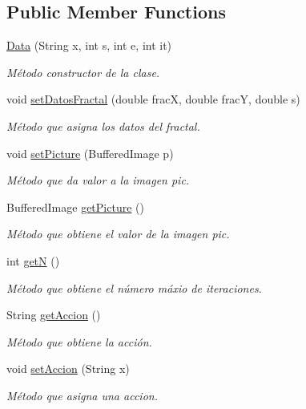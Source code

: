 \subsection*{Public Member Functions}
\begin{DoxyCompactItemize}
\item 
\hyperlink{class_data_a4fd35b503a2759c5b67b30ae97efeabf}{Data} (String x, int s, int e, int it)
\begin{DoxyCompactList}\small\item\em Método constructor de la clase. \end{DoxyCompactList}\item 
void \hyperlink{class_data_a3677f709c98be676148e4fb8e08b1015}{set\+Datos\+Fractal} (double frac\+X, double frac\+Y, double s)
\begin{DoxyCompactList}\small\item\em Método que asigna los datos del fractal. \end{DoxyCompactList}\item 
void \hyperlink{class_data_ae26392ae0b534ed76ac0fe98d0b087fc}{set\+Picture} (Buffered\+Image p)
\begin{DoxyCompactList}\small\item\em Método que da valor a la imagen pic. \end{DoxyCompactList}\item 
Buffered\+Image \hyperlink{class_data_a64deecf379fc77a5c7fcc37524e793ba}{get\+Picture} ()
\begin{DoxyCompactList}\small\item\em Método que obtiene el valor de la imagen pic. \end{DoxyCompactList}\item 
int \hyperlink{class_data_a6bf2736c6dd62244dc1430723a3af3a7}{get\+N} ()
\begin{DoxyCompactList}\small\item\em Método que obtiene el número máxio de iteraciones. \end{DoxyCompactList}\item 
String \hyperlink{class_data_aabcc9cef01bd77c86ef0f67b09f95739}{get\+Accion} ()
\begin{DoxyCompactList}\small\item\em Método que obtiene la acción. \end{DoxyCompactList}\item 
void \hyperlink{class_data_a05f25af1300bdf02700165e8652f9fc7}{set\+Accion} (String x)
\begin{DoxyCompactList}\small\item\em Método que asigna una accion. \end{DoxyCompactList}\item 

\end{DoxyCompactItemize}
